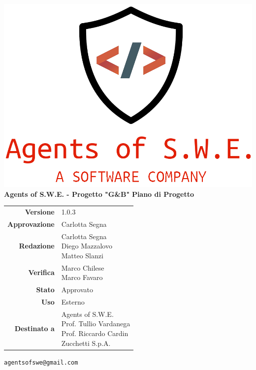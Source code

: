 


\usepackage{graphicx}

\renewcommand{\listtablename}{Indice delle Tabelle}
\renewcommand{\listfigurename}{Indice di Figure e Grafici}



\begin{titlepage}
\thispagestyle{empty}

\begin{center}
\includegraphics[scale=0.3]{./images/logo.png}\\
\large \textbf{Agents of S.W.E. - Progetto "G\&B"}
\vfill
\Huge \textbf{Piano di Progetto}
\vfill
\large
\renewcommand{\arraystretch}{1.3}
\begin{tabular}{r|l}


\textbf{Versione} & 1.0.3\\
\textbf{Approvazione} & Carlotta Segna\\
\textbf{Redazione} & \parbox[t]{5cm}{Carlotta Segna\\Diego Mazzalovo\\Matteo Slanzi}\\
\textbf{Verifica} & \parbox[t]{5cm}{Marco Chilese \\ Marco Favaro}\\
\textbf{Stato} & Approvato\\
\textbf{Uso} & Esterno\\
\textbf{Destinato a} & \parbox[t]{5cm}{Agents of S.W.E. \\Prof. Tullio Vardanega\\Prof. Riccardo Cardin \\ Zucchetti S.p.A.}
\end{tabular}
\vfill
\small
\texttt{agentsofswe@gmail.com}
\end{center}
\end{titlepage}

